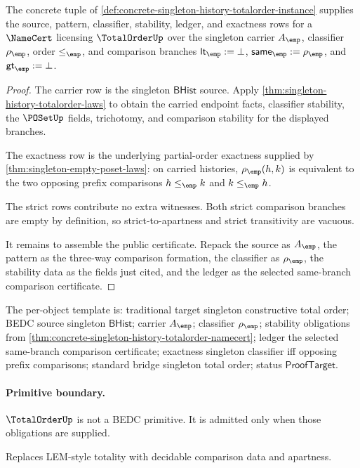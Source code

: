 \begin{theorem}
\label{thm:concrete-singleton-history-totalorder-namecert}
The concrete tuple of
\autoref{def:concrete-singleton-history-totalorder-instance} supplies the
source, pattern, classifier, stability, ledger, and exactness rows for a
$\NameCert$ licensing $\TotalOrderUp$ over the singleton carrier $A_{\emp}$,
classifier $\rho_{\emp}$, order $\le_{\emp}$, and comparison branches
$\mathsf{lt}_{\emp}:=\bot$, $\mathsf{same}_{\emp}:=\rho_{\emp}$, and
$\mathsf{gt}_{\emp}:=\bot$.
\end{theorem}
\begin{proof}
The carrier row is the singleton $\mathsf{BHist}$ source. Apply
\autoref{thm:singleton-history-totalorder-laws} to obtain the carried endpoint
facts, classifier stability, the $\POSetUp$ fields, trichotomy, and comparison
stability for the displayed branches.

The exactness row is the underlying partial-order exactness supplied by
\autoref{thm:singleton-empty-poset-laws}: on carried histories,
$\rho_{\emp}(h,k)$ is equivalent to the two opposing prefix comparisons
$h\le_{\emp}k$ and $k\le_{\emp}h$.

The strict rows contribute no extra witnesses. Both strict comparison branches
are empty by definition, so strict-to-apartness and strict transitivity are
vacuous.

It remains to assemble the public certificate. Repack the source as
$A_{\emp}$, the pattern as the three-way comparison formation, the classifier
as $\rho_{\emp}$, the stability data as the fields just cited, and the ledger
as the selected same-branch comparison certificate.
\end{proof}

The per-object template is: traditional target singleton constructive total
order; BEDC source singleton $\mathsf{BHist}$; carrier $A_{\emp}$; classifier
$\rho_{\emp}$; stability obligations from
\autoref{thm:concrete-singleton-history-totalorder-namecert}; ledger the
selected same-branch comparison certificate; exactness singleton classifier
iff opposing prefix comparisons; standard bridge singleton total order; status
$\mathsf{ProofTarget}$.

\paragraph{Primitive boundary.}
\(\TotalOrderUp\) is not a BEDC primitive. It is admitted only when those obligations are supplied.

\begin{remark}
\label{rem:totalorder-zero-axiom-note}
Replaces LEM-style totality with decidable comparison data and apartness.
\end{remark}
